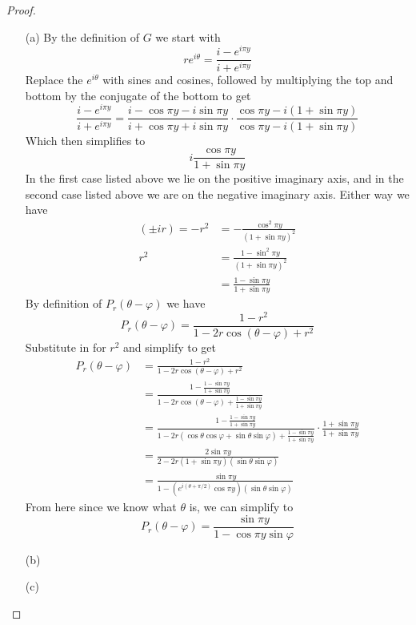 \documentclass[10pt]{article}
\newcommand{\sk}{\vskip 10mm}
\theoremstyle{remark}
\theoremstyle{remark}
\begin{document}
\begin{proof}
  \begin{enumerate}
  \item[(a)] By the definition of $G$ we start with
    \[
      re^{i\theta}=\frac{i-e^{i\pi y}}{i+e^{i\pi y}}
    \]
    Replace the $e^{i\theta}$ with sines and cosines, followed by multiplying the top and
    bottom by the conjugate of the bottom to get
    \[
      \frac{i-e^{i\pi y}}{i+e^{i\pi y}}=\frac{i-\cos\pi y-i\sin\pi y}{i+\cos\pi y+i\sin\pi y}\cdot\frac{\cos\pi y-i(1+\sin\pi y)}{\cos\pi y-i(1+\sin\pi y)}
    \]
    Which then simplifies to
    \[
      i\frac{\cos\pi y}{1+\sin\pi y}
    \]
    In the first case listed above we lie on the positive imaginary axis, and in the second case listed
    above we are on the negative imaginary axis. Either way we have
    \begin{align*}
      (\pm i r)=-r^2&= -\frac{\cos^2\pi y}{(1+\sin\pi y)^2}\\
      r^2 &= \frac{1-\sin^2\pi y}{(1+\sin\pi y)^2}\\
                 &= \frac{1-\sin\pi y}{1+\sin \pi y}
    \end{align*}
    By definition of $P_r(\theta-\varphi)$ we have
    \[
      P_r(\theta-\varphi)=\frac{1-r^2}{1-2r\cos(\theta-\varphi)+r^2}
    \]
    Substitute in for $r^2$ and simplify to get
    \begin{align*}
      P_r(\theta-\varphi)&=\frac{1-r^2}{1-2r\cos(\theta-\varphi)+r^2}\\
             &= \frac{1-\frac{1-\sin\pi y}{1+\sin \pi y}}{1-2r\cos(\theta-\varphi)+\frac{1-\sin\pi y}{1+\sin \pi y}}\\
             &=\frac{1-\frac{1-\sin\pi y}{1+\sin \pi y}}{1-2r(\cos\theta\cos\varphi+\sin\theta\sin\varphi)+\frac{1-\sin\pi y}{1+\sin \pi y}}\cdot\frac{1+\sin\pi y}{1+\sin\pi y}\\
             &=\frac{2\sin\pi y}{2-2r(1+\sin\pi y)(\sin\theta\sin\varphi)}\\
             &=\frac{\sin\pi y}{1-(e^{i(\theta+\pi/2)}\cos\pi y)(\sin\theta\sin\varphi)}
    \end{align*}
    From here since we know what $\theta$ is, we can simplify to
    \[
      P_r(\theta-\varphi)=\frac{\sin\pi y}{1-\cos\pi y\sin\varphi}
    \]
  \item[(b)]
  \item[(c)]
  \end{enumerate}
\end{proof}

\sk
\end{document}
